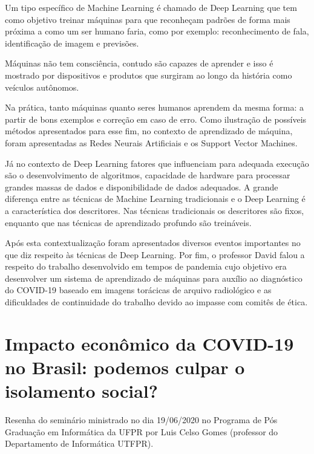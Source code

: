 \documentclass[
	12pt,				%
	openright,			%
	twoside,			%
	a4paper,			%
	english,			%
	brazil,				%
	svgnames
	]{abntex2}\usepackage[]{graphicx}\usepackage[]{color}
\begin{document}
Um tipo específico de Machine Learning é chamado de Deep Learning que tem como objetivo treinar máquinas para que reconheçam padrões de forma mais próxima a como um ser humano faria, como por exemplo: reconhecimento de fala, identificação de imagem e previsões.

Máquinas não tem consciência, contudo são capazes de aprender e isso é mostrado por dispositivos e produtos que surgiram ao longo da história como veículos autônomos. 

Na prática, tanto máquinas quanto seres humanos aprendem da mesma forma: a partir de bons exemplos e correção em caso de erro. Como ilustração de possíveis métodos apresentados para esse fim, no contexto de aprendizado de máquina, foram apresentadas as Redes Neurais Artificiais e os Support Vector Machines. 

Já no contexto de Deep Learning fatores que influenciam para adequada execução são o desenvolvimento de algoritmos, capacidade de hardware para processar grandes massas de dados e disponibilidade de dados adequados. A grande diferença entre as técnicas de Machine Learning tradicionais e o Deep Learning é a característica dos descritores. Nas técnicas tradicionais os descritores são fixos, enquanto que nas técnicas de aprendizado profundo são treináveis.

Após esta contextualização foram apresentados diversos eventos importantes no que diz respeito às técnicas de Deep Learning. Por fim, o professor David falou a respeito do trabalho desenvolvido em tempos de pandemia cujo objetivo era desenvolver um sistema de aprendizado de máquinas para auxílio ao diagnóstico do COVID-19 baseado em imagens torácicas de arquivo radiológico e as dificuldades de continuidade do trabalho devido ao impasse com comitês de ética.





\chapter{Impacto econômico da COVID-19 no Brasil: podemos culpar o isolamento social?}
\label{cap:res9}


Resenha do seminário ministrado no dia 19/06/2020 no Programa de Pós Graduação em Informática da UFPR por Luis Celso Gomes (professor do Departamento de Informática UTFPR).
\end{document}
